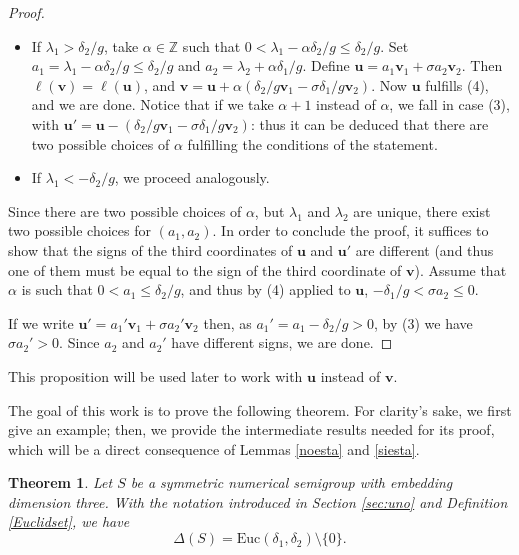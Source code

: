 \documentclass[11pt]{amsart}
\newtheorem{theorem}{Theorem}
\theoremstyle{remark}
\begin{document}
\begin{proof}
\begin{itemize}
  	\item If $\lambda_1>\delta_2/g$, take $\alpha\in \mathbb Z$ such that $0<\lambda_1-\alpha\delta_2/g\le \delta_2/g$. Set $a_1=\lambda_1-\alpha\delta_2/g\le \delta_2/g$ and $a_2=\lambda_2+\alpha\delta_1/g$. Define $\mathbf u=a_1\mathbf v_1+\sigma a_2\mathbf v_2$. Then $\ell(\mathbf v)=\ell(\mathbf u)$, and $\mathbf v=\mathbf u+\alpha(\delta_2/g\mathbf v_1-\sigma\delta_1/g\mathbf v_2)$. Now $\mathbf u$ fulfills (4), and we are done. Notice that if we take $\alpha+1$ instead of $\alpha$, we fall in case (3), with $\mathbf u'=\mathbf u-(\delta_2/g\mathbf v_1-\sigma\delta_1/g\mathbf v_2)$: thus it can be deduced that there are two possible choices of $\alpha$ fulfilling the conditions of the statement.
  	\item If $\lambda_1<-\delta_2/g$, we proceed analogously.
\end{itemize}
Since there are two possible choices of $\alpha$, but $\lambda_1$ and $\lambda_2$ are unique, there exist two possible choices for $(a_1,a_2)$. In order to conclude the proof, it suffices to show that the signs of the third coordinates of $\mathbf u$ and $\mathbf u'$ are different (and thus one of them must be equal to the sign of the third coordinate of $\mathbf v$).  Assume that $\alpha$ is such that $0<a_1\le \delta_2/g$, and thus by (4) applied to $\mathbf u$, $-\delta_1/g<\sigma a_2\le 0$. 

If we write $\mathbf u'=a_1'\mathbf v_1+\sigma a_2'\mathbf v_2$ then, as $a_1'=a_1-\delta_2/g>0$, by (3) we have $\sigma a_2'>0$. Since $a_2$ and $a_2'$ have different signs, we are done.
\end{proof}

This proposition will be used later to work with $\mathbf u$ instead of $\mathbf v$. 


The goal of this work is to prove the following theorem. For clarity's sake, we first give an example; then, we provide the intermediate results needed for its proof, which will be a direct consequence of Lemmas \ref{noesta} and \ref{siesta}.

\begin{theorem}\label{unionDs}
Let $S$ be a symmetric numerical semigroup with embedding dimension three. With the notation introduced in Section \ref{sec:uno} and Definition \ref{Euclidset}, we have 
\[
\Delta(S)=\mathrm{Euc}(\delta_1,\delta_2)\setminus\{0\}.
\]
\end{theorem}
\end{document}
